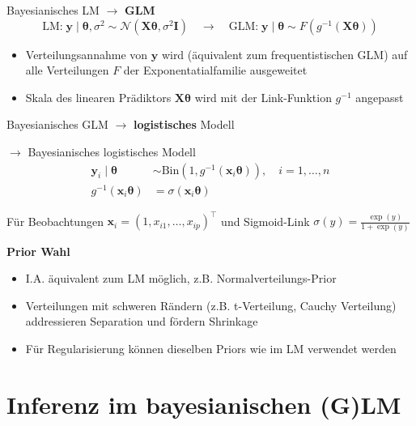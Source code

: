 \documentclass[
  ignorenonframetext,
  aspectratio=169,
]{beamer}
\providecommand{\tightlist}{%
  \setlength{\itemsep}{0pt}\setlength{\parskip}{0pt}}
\newcommand{\bx}{\bm{x}}
\newcommand{\by}{\bm{y}}
\newcommand{\bI}{\bm{I}}
\newcommand{\bX}{\bm{X}}
\newcommand{\Ncal}{\mathcal{N}}
\newcommand{\ssd}{\sigma^2}
\newcommand{\btheta}{\bm{\theta}}
\begin{document}
\begin{frame}{Bayesianisches LM \(\to\) \textbf{GLM}}
\protect{}\label{bayesianisches-lm-to-glm}
\[
\text{LM:} \; \by \mid \btheta, \ssd \sim \Ncal(\bX \btheta, \ssd \bI) \quad
\to \quad \text{GLM:} \; \by \mid \btheta \sim F(g^{-1}(\bX \btheta))
\]

\begin{itemize}
\tightlist
\item
  Verteilungsannahme von \(\by\) wird (äquivalent zum frequentistischen
  GLM) auf alle Verteilungen \(F\) der Exponentatialfamilie ausgeweitet
\item
  Skala des linearen Prädiktors \(\bX \btheta\) wird mit der
  Link-Funktion \(g^{-1}\) angepasst
\end{itemize}
\end{frame}

\begin{frame}{Bayesianisches GLM \(\to\) \textbf{logistisches} Modell}
\protect{}\label{bayesianisches-glm-to-logistisches-modell}
\begin{block}{\(\to\) Bayesianisches logistisches Modell}
\protect{}\label{to-bayesianisches-logistisches-modell}
\[
\begin{aligned}
  \by_i \mid \btheta &\sim \text{Bin}(1, g^{-1}(\bx_i \btheta)), \quad i = 1, \dots, n \\
  g^{-1}(\bx_i \btheta) &= \sigma(\bx_i \btheta)
\end{aligned}
\]

Für Beobachtungen \(\bx_i = (1, x_{i1}, \dots, x_{ip})^\top\) und
Sigmoid-Link \(\sigma(y) = \frac{\exp(y)}{1 + \exp(y)}\)
\end{block}

\textbf{Prior Wahl}

\begin{itemize}
\tightlist
\item
  I.A. äquivalent zum LM möglich, z.B. Normalverteilungs-Prior
\item
  Verteilungen mit schweren Rändern (z.B. t-Verteilung, Cauchy
  Verteilung) addressieren Separation und fördern Shrinkage
  \autocite{gelman_weakly_2008,ghosh_use_2017}
\item
  Für Regularisierung können dieselben Priors wie im LM verwendet werden
  \autocite{ohara_review_2009,fahrmeir_bayesian_2010,van_erp_shrinkage_2019}
\end{itemize}
\end{frame}

\section{Inferenz im bayesianischen
(G)LM}\label{inferenz-im-bayesianischen-glm}
\end{document}
